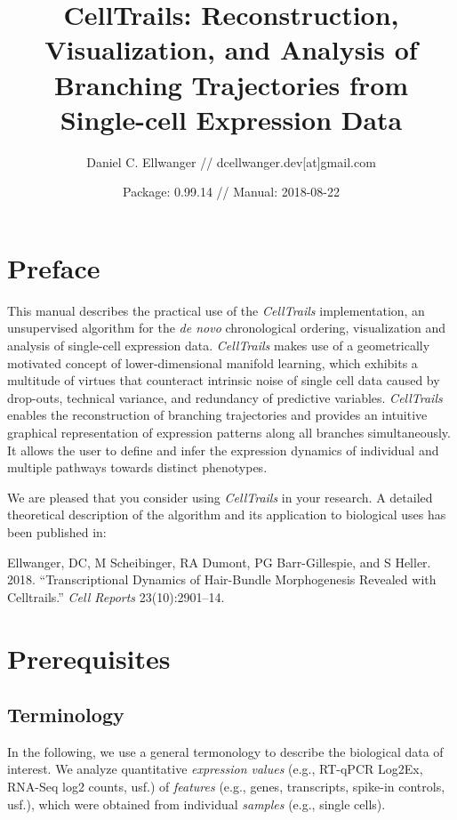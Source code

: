 \documentclass[]{book}
\title{CellTrails: Reconstruction, Visualization, and Analysis of Branching
Trajectories from Single-cell Expression Data}
\author{Daniel C. Ellwanger // dcellwanger.dev{[}at{]}gmail.com}
\date{Package: 0.99.14 // Manual: 2018-08-22}
\theoremstyle{definition}
\theoremstyle{definition}
\theoremstyle{definition}
\theoremstyle{remark}
\begin{document}
\maketitle

{
\setcounter{tocdepth}{1}
\tableofcontents
}
\chapter*{Preface}\label{preface}

This manual describes the practical use of the \emph{CellTrails}
implementation, an unsupervised algorithm for the \emph{de novo}
chronological ordering, visualization and analysis of single-cell
expression data. \emph{CellTrails} makes use of a geometrically
motivated concept of lower-dimensional manifold learning, which exhibits
a multitude of virtues that counteract intrinsic noise of single cell
data caused by drop-outs, technical variance, and redundancy of
predictive variables. \emph{CellTrails} enables the reconstruction of
branching trajectories and provides an intuitive graphical
representation of expression patterns along all branches simultaneously.
It allows the user to define and infer the expression dynamics of
individual and multiple pathways towards distinct phenotypes.

We are pleased that you consider using \emph{CellTrails} in your
research. A detailed theoretical description of the algorithm and its
application to biological uses has been published in:

Ellwanger, DC, M Scheibinger, RA Dumont, PG Barr-Gillespie, and S
Heller. 2018. ``Transcriptional Dynamics of Hair-Bundle Morphogenesis
Revealed with Celltrails.'' \emph{Cell Reports} 23(10):2901--14.

\chapter{Prerequisites}\label{prerequisites}

\section{Terminology}\label{terminology}

In the following, we use a general termonology to describe the
biological data of interest. We analyze quantitative \emph{expression
values} (e.g., RT-qPCR Log2Ex, RNA-Seq log2 counts, usf.) of
\emph{features} (e.g., genes, transcripts, spike-in controls, usf.),
which were obtained from individual \emph{samples} (e.g., single cells).
\end{document}
